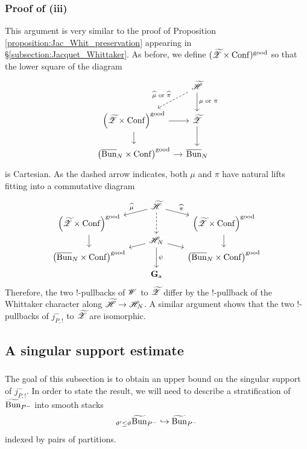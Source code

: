 \subsubsection{Proof of (iii)} This argument is very similar to the proof of Proposition \ref{proposition:Jac_Whit_preservation} appearing in \S\ref{subsection:Jacquet_Whittaker}. As before, we define $({\widetilde{\mathscr{Z}}} \times \mathrm{Conf})^{\mathrm{good}}$ so that the lower square of the diagram
\[
\begin{tikzcd}[
  column sep={7.5em,between origins},
  row sep={4em,between origins}
]
  & \HHt \arrow[dl, dashed, "\text{$\widehat{\mu}$ or $\widehat{\pi}$}" above left] \arrow[d, "\text{$\mu$ or $\pi$}"] \\ 
  \left(\ZZt \times \Conf\right)^\good \arrow[r] \arrow[d] & \ZZt \arrow[d] \\
  \left( \Bunc_N \times \Conf \right)^\good \arrow[r] & \Bunc_N
\end{tikzcd}
\]
is Cartesian. As the dashed arrow indicates, both $\mu$ and $\pi$ have natural lifts fitting into a commutative diagram
\[
\begin{tikzcd}[
  column sep={8em,between origins},
  row sep={2em,between origins}
]
    & \HHt \arrow[dl, "\widehat{\mu}" above left] \arrow[dr, "\widehat{\pi}"] \arrow[dd, dashed] & \\
    \left(\ZZt \times \Conf \right)^\good \arrow[dd] & & \left(\ZZt \times \Conf \right)^\good \arrow[dd] \\
    & \HH_N \arrow[dl] \arrow[dr] \arrow[dd, "\psi"] & \\
    \left(\Bunc_N \times \Conf \right)^\good & & \left(\Bunc_N \times \Conf \right)^\good \\
    & \Ga &
\end{tikzcd}
\]
Therefore, the two $!$-pullbacks of $\mathscr{W}$ to ${\widetilde{\mathscr{Z}}}$ differ by the $!$-pullback of the Whittaker character along $\widetilde{\mathscr{H}} \to \mathscr{H}_N$. A similar argument shows that the two $!$-pullbacks of $j_{P,!}^-$ to ${\widetilde{\mathscr{Z}}}$ are isomorphic.

\subsection{A singular support estimate}

\subsubsection{} The goal of this subsection is to obtain an upper bound on the singular support of $j_{P,!}^-$. In order to state the result, we will need to describe a stratification of $\widetilde{\mathrm{Bun}}_{P^-}$ into smooth stacks
  \[{}_{\vartheta' \le \vartheta}\widetilde{\mathrm{Bun}}_{P^-} \hookrightarrow \widetilde{\mathrm{Bun}}_{P^-}\]
indexed by pairs of partitions.

